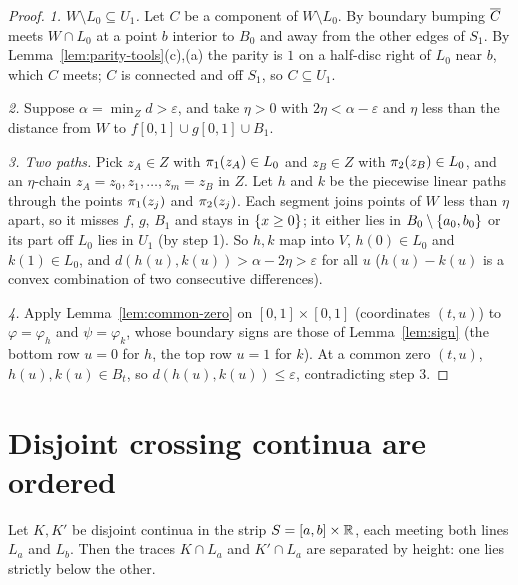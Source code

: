 \begin{proof}
\emph{1. $W\setminus L_0\subseteq U_1$.} Let $C$ be a component of $W\setminus L_0$. By boundary bumping $\overline{C}$ meets $W\cap L_0$ at a point $b$ interior to $B_0$ and away from
the other edges of $S_1$. By Lemma~\ref{lem:parity-tools}(c),(a) the parity is $1$ on a half-disc right of $L_0$ near $b$, which $C$ meets; $C$ is connected and off
$S_1$, so $C\subseteq U_1$.

\emph{2.} Suppose $\alpha=\min_Zd>\varepsilon$, and take $\eta>0$ with $2\eta<\alpha-\varepsilon$ and $\eta$ less than the distance from $W$ to $f[0,1]\cup g[0,1]\cup B_1$.

\emph{3. Two paths.} Pick $z_A\in Z$ with $\pi_{1}(z_A)\in L_0$ and $z_B\in Z$ with $\pi_{2}(z_B)\in L_0$, and an $\eta$-chain $z_A=z_0,z_1,\dots,z_m=z_B$ in $Z$. Let $h$ and $k$ be the
piecewise linear paths through the points $\pi_{1}(z_j)$ and $\pi_{2}(z_j)$. Each segment joins points of $W$ less than $\eta$ apart, so it misses $f$, $g$, $B_1$ and stays in
$\left\{ x\ge0 \right\}$; it either lies in $B_0\setminus\left\{ a_0,b_0 \right\}$ or its part off $L_0$ lies in $U_1$ (by step 1). So $h,k$ map into $V$, $h(0)\in L_0$ and $k(1)\in L_0$, and
$d(h(u),k(u))>\alpha-2\eta>\varepsilon$ for all $u$ ($h(u)-k(u)$ is a convex combination of two consecutive differences).

\emph{4.} Apply Lemma~\ref{lem:common-zero} on $[0,1]\times[0,1]$ (coordinates $(t,u)$) to $\varphi=\varphi_h$ and $\psi=\varphi_k$, whose boundary signs are those of
Lemma~\ref{lem:sign} (the bottom row $u=0$ for $h$, the top row $u=1$ for $k$). At a common zero $(t,u)$, $h(u),k(u)\in B_t$, so $d(h(u),k(u))\le\varepsilon$, contradicting
step 3.
\end{proof}


\section{Disjoint crossing continua are ordered}

\begin{proposition}\label{prop:ordered}
Let $K,K'$ be disjoint continua in the strip $S=[a,b]\times\mathbb{R}$, each meeting both lines $L_a$ and $L_b$. Then the traces $K\cap L_a$ and $K'\cap L_a$ are separated
by height: one lies strictly below the other.
\end{proposition}

